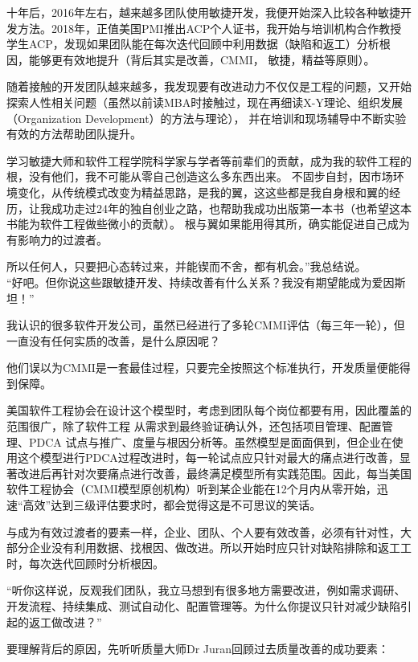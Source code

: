 {\begin{minipage}[t]{0.97\columnwidth}
十年后，2016年左右，越来越多团队使用敏捷开发，我便开始深入比较各种敏捷开发方法。2018年，正值美国PMI推出ACP个人证书，我开始与培训机构合作教授学生ACP，发现如果团队能在每次迭代回顾中利用数据（缺陷和返工）分析根因，能够更有效地提升（背后其实是改善，CMMI， 敏捷，精益等原则）。


随着接触的开发团队越来越多，我发现要有改进动力不仅仅是工程的问题，又开始探索人性相关问题（虽然以前读MBA时接触过，现在再细读X-Y理论、组织发展（Organization Development）的方法与理论）， 并在培训和现场辅导中不断实验有效的方法帮助团队提升。


学习敏捷大师和软件工程学院科学家与学者等前辈们的贡献，成为我的软件工程的根，没有他们，我不可能从零自己创造这么多东西出来。 不固步自封，因市场环境变化，从传统模式改变为精益思路，是我的翼，这这些都是我自身根和翼的经历，让我成功走过24年的独自创业之路，也帮助我成功出版第一本书（也希望这本书能为软件工程做些微小的贡献）。
根与翼如果能用得其所，确实能促进自己成为有影响力的过渡者。 

\strut
\end{minipage}} 

所以任何人，只要把心态转过来，并能锲而不舍，都有机会。”我总结说。\\
“好吧。但你说这些跟敏捷开发、持续改善有什么关系？我没有期望能成为爱因斯坦！” 

我认识的很多软件开发公司，虽然已经进行了多轮CMMI评估（每三年一轮），但一直没有任何实质的改善，是什么原因呢？

他们误以为CMMI是一套最佳过程，只要完全按照这个标准执行，开发质量便能得到保障。

美国软件工程协会在设计这个模型时，考虑到团队每个岗位都要有用，因此覆盖的范围很广，除了软件工程 从需求到最终验证确认外，还包括项目管理、配置管理、PDCA 试点与推广、度量与根因分析等。虽然模型是面面俱到，但企业在使用这个模型进行PDCA过程改进时，每一轮试点应只针对最大的痛点进行改善，显著改进后再针对次要痛点进行改善，最终满足模型所有实践范围。因此，每当美国软件工程协会（CMMI模型原创机构）听到某企业能在12个月内从零开始，迅速“高效”达到三级评估要求时，都会觉得这是不可思议的笑话。

与成为有效过渡者的要素一样，企业、团队、个人要有效改善，必须有针对性，大部分企业没有利用数据、找根因、做改进。所以开始时应只针对缺陷排除和返工工时，每次迭代回顾时分析根因。 

“听你这样说，反观我们团队，我立马想到有很多地方需要改进，例如需求调研、开发流程、持续集成、测试自动化、配置管理等。为什么你提议只针对减少缺陷引起的返工做改进？”

要理解背后的原因，先听听质量大师Dr Juran回顾过去质量改善的成功要素： 

